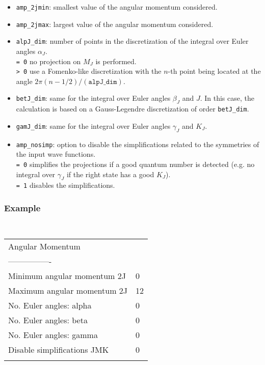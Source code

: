 \documentclass[a4paper,11pt]{article}
\newcommand{\ttt}[1]{\texttt{#1}}
\begin{document}
\begin{itemize}
 \item \ttt{amp\_2jmin}: smallest value of the angular momentum considered.
 \item \ttt{amp\_2jmax}: largest  value of the angular momentum considered.
 \item \ttt{alpJ\_dim}: number of points in the discretization of the integral over Euler angles $\alpha_J$. \\[0.05cm]
  \ttt{= 0\:} no projection on $M_J$ is performed. \\[0.05cm]
  \ttt{> 0\:} use a Fomenko-like discretization with the $n$-th point being located at the angle $2\pi (n-1/2)/(\ttt{alpJ\_dim})$. 
 \item \ttt{betJ\_dim}: same for the integral over Euler angles $\beta_J$ and $J$. In this case, the calculation is based on a Gauss-Legendre discretization of order \ttt{betJ\_dim}.
 \item \ttt{gamJ\_dim}: same for the integral over Euler angles $\gamma_J$ and $K_J$.    
 \item \ttt{amp\_nosimp}: option to disable the simplifications related to the symmetries of the input wave functions. \\[0.05cm]
  \ttt{= 0\:} simplifies the projections if a good quantum number is detected (e.g. no integral over $\gamma_J$ if the right state has a good $K_J$). \\[0.05cm]
  \ttt{= 1\:} disables the simplifications.

\end{itemize}

\subsubsection*{Example}
\begin{center}
\tt
\begin{tabular}{|ll|}
\hline
Angular Momentum              &      \\
----------------              &      \\
Minimum angular momentum 2J   &0     \\
Maximum angular momentum 2J   &12    \\
No. Euler angles: alpha       &0     \\
No. Euler angles: beta        &0     \\
No. Euler angles: gamma       &0     \\
Disable simplifications JMK   &0     \\
                              &      \\
\hline
\end{tabular}
\end{center}
\end{document}
